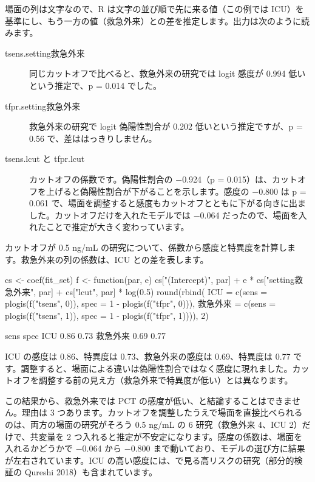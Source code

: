 場面の列は文字なので、R は文字の並び順で先に来る値（この例では ICU）を基準にし、もう一方の値（救急外来）との差を推定します。出力は次のように読みます。

\begin{description}
\item[tsens.setting救急外来] 同じカットオフで比べると、救急外来の研究では logit 感度が 0.994 低いという推定で、p = 0.014 でした。
\item[tfpr.setting救急外来] 救急外来の研究で logit 偽陽性割合が 0.202 低いという推定ですが、p = 0.56 で、差ははっきりしません。
\item[tsens.lcut と tfpr.lcut] カットオフの係数です。偽陽性割合の −0.924（p = 0.015）は、カットオフを上げると偽陽性割合が下がることを示します。感度の −0.800 は p = 0.061 で、場面を調整すると感度もカットオフとともに下がる向きに出ました。カットオフだけを入れたモデルでは −0.064 だったので、場面を入れたことで推定が大きく変わっています。
\end{description}

カットオフが 0.5 ng/mL の研究について、係数から感度と特異度を計算します。救急外来の列の係数は、ICU との差を表します。

\begin{rcode}
cs <- coef(fit_set)
f <- function(par, e) cs["(Intercept)", par] +
  e * cs["setting救急外来", par] + cs["lcut", par] * log(0.5)
round(rbind(
  ICU = c(sens = plogis(f("tsens", 0)),
          spec = 1 - plogis(f("tfpr", 0))),
  救急外来 = c(sens = plogis(f("tsens", 1)),
              spec = 1 - plogis(f("tfpr", 1)))), 2)
\end{rcode}

\begin{rout}
         sens spec
ICU      0.86 0.73
救急外来 0.69 0.77
\end{rout}

ICU の感度は 0.86、特異度は 0.73、救急外来の感度は 0.69、特異度は 0.77 です。調整すると、場面による違いは偽陽性割合ではなく感度に現れました。カットオフを調整する前の見え方（救急外来で特異度が低い）とは異なります。

この結果から、救急外来では PCT の感度が低い、と結論することはできません。理由は 3 つあります。カットオフを調整したうえで場面を直接比べられるのは、両方の場面の研究がそろう 0.5 ng/mL の 6 研究（救急外来 4、ICU 2）だけで、共変量を 2 つ入れると推定が不安定になります。感度の係数は、場面を入れるかどうかで −0.064 から −0.800 まで動いており、モデルの選び方に結果が左右されています。ICU の高い感度には、で見る高リスクの研究（部分的検証の Qureshi 2018）も含まれています。

